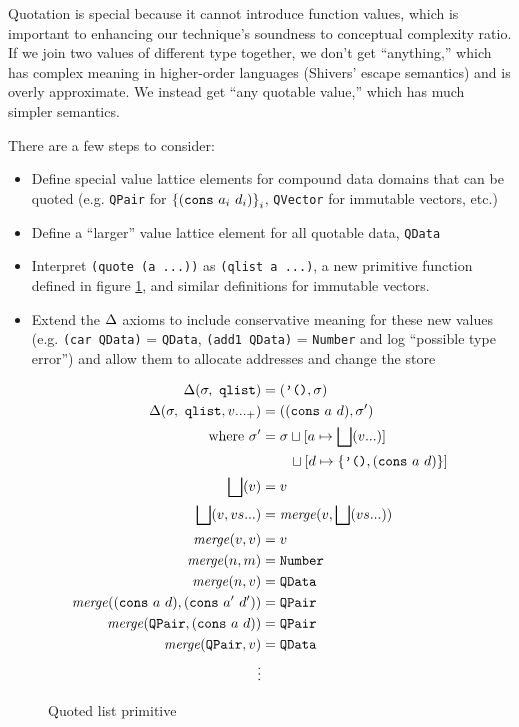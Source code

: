 \documentclass[preprint,onecolumn,9pt]{sigplanconf} %
\begin{document}
Quotation is special because it cannot introduce function values,
which is important to enhancing our technique's soundness to
conceptual complexity ratio. If we join two values of different type
together, we don't get ``anything,'' which has complex meaning in
higher-order languages (Shivers' escape semantics) and is overly
approximate. We instead get ``any quotable value,'' which has much
simpler semantics.

There are a few steps to consider:
\begin{itemize}
 \item{Define special value lattice elements for compound data domains that can be quoted
       (e.g. {\tt QPair} for $\left\{ ({\tt cons}\ a_i\ d_i)\right\}_i$, {\tt QVector} for immutable vectors, etc.)}
 \item{Define a ``larger'' value lattice element for all quotable data, {\tt QData}}
 \item{Interpret {\tt (quote (a ...))} as {\tt (qlist a ...)}, a new primitive function defined in figure \ref{fig:qlist},
       and similar definitions for immutable vectors.}
 \item{Extend the $\Delta$ axioms to include conservative
   meaning for these new values (e.g. {\tt (car QData)} = {\tt QData},
   {\tt (add1 QData)} = {\tt Number} and log ``possible type error'')
   and allow them to allocate addresses and change the store}
\end{itemize}

\begin{figure}
\begin{align*}
\Delta(\sigma,\ {\tt qlist}) &= (\mbox{{\tt '()}}, \sigma) \\
\Delta(\sigma,\ {\tt qlist}, v ..._+) &= (({\tt cons}\ a\ d), \sigma') \\
\qquad \mbox{where } \sigma' &= \sigma\sqcup[a \mapsto \bigsqcup(v ...)] \\
                            &\qquad \sqcup[d \mapsto \{ \mbox{{\tt '()}}, ({\tt cons}\ a\ d)\}] \\
\bigsqcup(v) &= v \\
\bigsqcup(v, vs ...) &= \mathit{merge}(v, \bigsqcup(vs ...)) \\
\mathit{merge}(v, v) &= v \\
\mathit{merge}(n, m) &= {\tt Number} \\
\mathit{merge}(n, v) &= {\tt QData} \\
\mathit{merge}(({\tt cons}\ a\ d), ({\tt cons}\ a'\ d')) &= {\tt QPair} \\
\mathit{merge}({\tt QPair}, ({\tt cons}\ a\ d)) &= {\tt QPair} \\
\mathit{merge}({\tt QPair}, v) &= {\tt QData} \\
\vdots
\end{align*}
\caption{Quoted list primitive}
\label{fig:qlist}
\end{figure}
\end{document}
